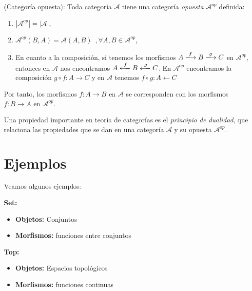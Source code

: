 \begin{definicion}
    (Categoría opuesta): Toda categoría $\mathscr{A}$ tiene una categoría \textit{opuesta} $\mathscr{A}^{op}$ definida:
    \begin{enumerate}
        \item $|\mathscr{A}^{op}| = |\mathscr{A}|$,
        \item $\mathscr{A}^{op}(B,A) = \mathscr{A}(A,B) \, \, \, , \forall A,B \in \mathscr{A}^{op}$,
        \item En cuanto a la composición, si tenemos los morfismos $A \xlongrightarrow{f} B \xlongrightarrow{g} C $ en $\mathscr{A}^{op}$, entonces en $\mathscr{A}$ nos encontramos  $A \xlongleftarrow{f} B \xlongleftarrow{g} C $. En $\mathscr{A}^{op}$ encontramos la composición $g \circ f: A \longrightarrow C$ y en $\mathscr{A}$ tenemos $f \circ g: A \longleftarrow C$
    \end{enumerate}
    Por tanto, los morfismos $f: A \longrightarrow B$ en $\mathscr{A}$ se corresponden con los morfismos $f: B \longrightarrow A$ en $\mathscr{A}^{op}$.
\end{definicion}

Una propiedad importante en teoría de categorías es el \textit{principio de dualidad}, que relaciona las propiedades que se dan en una categoría $\mathscr{A}$ y su opuesta $\mathscr{A}^{op}$.

\section{Ejemplos}
Veamos algunos ejemplos:

\begin{ejemplo}
    \textbf{Set: } 
    \begin{itemize}
        \item \textbf{Objetos: } Conjuntos
        \item \textbf{Morfismos: } funciones entre conjuntos
    \end{itemize}
\end{ejemplo}

\begin{ejemplo}
    \textbf{Top: } 
    \begin{itemize}
        \item \textbf{Objetos: } Espacios topológicos
        \item \textbf{Morfismos: } funciones continuas
    \end{itemize}
\end{ejemplo}

